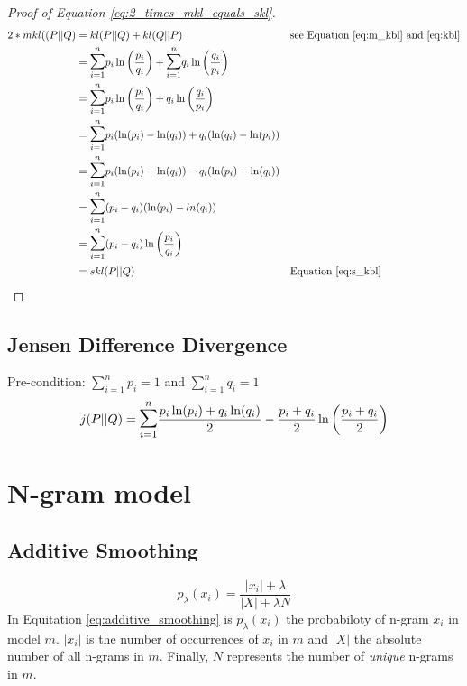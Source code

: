 \documentclass[10pt,a4paper]{article}
\begin{document}
\begin{proof}[Proof of Equation \ref{eq:2_times_mkl_equals_skl}]
\begin{align*}
	2 * mkl((P||Q) 	&= kl(P||Q) + kl(Q||P) && \mbox{see Equation \ref{eq:m_kbl} and \ref{eq:kbl}}\\
					&= \mathlarger{\mathlarger{\sum}}\limits_{i=1}^n p_i \ln \left(\frac{p_i}{q_i}\right) + \mathlarger{\mathlarger{\sum}}\limits_{i=1}^n q_i \ln \left(\frac{q_i}{p_i}\right) && \\
					&= \mathlarger{\mathlarger{\sum}}\limits_{i=1}^n p_i \ln \left(\frac{p_i}{q_i}\right) + q_i \ln \left(\frac{q_i}{p_i}\right) && \\
					&= \mathlarger{\mathlarger{\sum}}\limits_{i=1}^n p_i (\ln(p_i) - \ln(q_i)) + q_i (\ln(q_i) - \ln(p_i)) && \\
					&= \mathlarger{\mathlarger{\sum}}\limits_{i=1}^n p_i (\ln(p_i) - \ln(q_i)) - q_i (\ln(p_i) - \ln(q_i)) && \\
					&= \mathlarger{\mathlarger{\sum}}\limits_{i=1}^n (p_i - q_i)(\ln(p_i) - ln(q_i)) && \\
					&= \mathlarger{\mathlarger{\sum}}\limits_{i=1}^n (p_i-q_i) \ln \left(\frac{p_i}{q_i}\right) && \\
					&= skl(P||Q) && \mbox{Equation \ref{eq:s_kbl}}
\end{align*}
\end{proof}


\subsection{Jensen Difference Divergence}
Pre-condition: $\sum\limits_{i=1}^n p_i = 1$ and $\sum\limits_{i=1}^n q_i = 1$
\begin{equation}
  j(P||Q) = \mathlarger{\mathlarger{\sum}}\limits_{i=1}^n \frac{p_i \ln(p_i) + q_i \ln(q_i)}{2} - \frac{p_i+q_i}{2} \ln\left( \frac{p_i+q_i}{2} \right)
\end{equation}

\section{N-gram model}
\subsection{Additive Smoothing}
\begin{equation}
\label{eq:additive_smoothing}
p_{\lambda}(x_i)=\frac{|x_i|+\lambda}{|X|+\lambda N}
\end{equation}
In Equitation \ref{eq:additive_smoothing} is $p_\lambda(x_i)$ the probabiloty of n-gram $x_i$ in model $m$.
$|x_i|$ is the number of occurrences of $x_i$ in $m$ and $|X|$ the absolute number of all n-grams in $m$.
Finally, $N$ represents the number of \emph{unique} n-grams in $m$.
\end{document}
